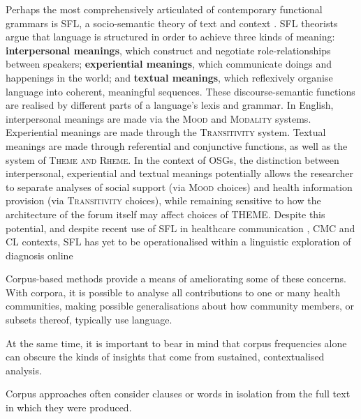 \documentclass{article}
\renewcommand{\cite}{\parencite}
\begin{document}

Perhaps the most comprehensively articulated of contemporary functional grammars \cite{eggins_analysing_2004} is SFL, a socio-semantic theory of text and context \cite{halliday_introduction:_2004}. SFL theorists argue that language is structured in order to achieve three kinds of meaning: \textbf{interpersonal meanings}, which construct and negotiate role-relationships between speakers; \textbf{experiential meanings}, which communicate doings and happenings in the world; and \textbf{textual meanings}, which reflexively organise language into coherent, meaningful sequences. These discourse-semantic functions are realised by different parts of a language's lexis and grammar. In English, interpersonal meanings are made via the \textsc{Mood} and \textsc{Modality} systems. Experiential meanings are made through the \textsc{Transitivity} system. Textual meanings are made through referential and conjunctive functions, as well as the system of \textsc{Theme and Rheme}. In the context of OSGs, the distinction between interpersonal, experiential and textual meanings potentially allows the researcher to separate analyses of social support (via \textsc{Mood} choices) and health information provision (via \textsc{Transitivity} choices), while remaining sensitive to how the architecture of the forum itself may affect choices of THEME. Despite this potential, and despite recent use of SFL in healthcare communication \cite{matthiessen_applying_2013,slade_communicating_2015,woodward-kron_international_2016}, CMC \cite{lander_building_2014,zappavigna_enacting_2013} and CL \cite{hunston_systemic_2013,thompson_system_2014} contexts, SFL has yet to be operationalised within a linguistic exploration of diagnosis online

Corpus-based methods provide a means of ameliorating some of these concerns. With corpora, it is possible to analyse all contributions to one or many health communities, making possible generalisations about how community members, or subsets thereof, typically use language.

At the same time, it is important to bear in mind that corpus frequencies alone can obscure the kinds of insights that come from sustained, contextualised analysis.

Corpus approaches often consider clauses or words in isolation from the full text in which they were produced.
\end{document}
